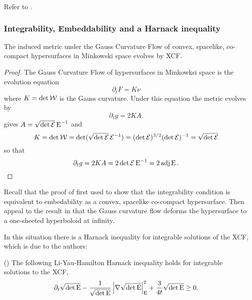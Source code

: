 \documentclass[a4paper,12pt]{amsart}
\begin{document}
{\color{red} Refer to \cite{MR2448593}.}


\subsubsection{Integrability, Embeddability and a Harnack inequality}
\label{subsec:xcf_gcf}

\begin{lemma}
\label{lem:xcf_gcf}
The induced metric under the Gauss Curvature Flow of convex, spacelike, co-compact hypersurfaces in Minkowski space evolves by XCF.
\end{lemma}

\begin{proof}
The Gauss Curvature Flow of hypersurfaces in Minkowksi space is the evolution equation
\[
\partial_t F = K\nu
\]
where \(K = \det \operatorname{\mathcal{W}}\) is the Gauss curvature. Under this equation the metric evolves by
\[
\partial_t g = 2KA.
\]
 gives \(A = \sqrt{\det \operatorname{\mathcal{E}}} \operatorname{E}^{-1}\) and
\[
K = \det \operatorname{\mathcal{W}} = \det (\sqrt{\det \operatorname{\mathcal{E}}} \operatorname{\mathcal{E}}^{-1}) = (\det \operatorname{\mathcal{E}})^{3/2} (\det \operatorname{\mathcal{E}})^{-1} = \sqrt{\det \operatorname{\mathcal{E}}}
\]
so that
\[
\partial_t g = 2KA = 2 \det \operatorname{\mathcal{E}} \operatorname{E}^{-1} = 2 \operatorname{adj} \operatorname{E}.
\]
\end{proof}

Recall that the proof of  first used  to show that the integrability condition is equivalent to embedability as a convex, spacelike co-compact hypersurface. Then appeal to the result in \cite[12. Application to the cross-curvature flow]{MR3344442} that the Gauss curvature flow deforms the hypersurface to a one-sheeted hyperboloid at infinity. 

In this situation there is a Harnack inequality for integrable solutions of the XCF, which is due to the authors:

\begin{thm}(\cite[Section 6]{BIS4})
\label{thm:harnack}
The following Li-Yau-Hamilton Harnack inequality holds for integrable solutions to the XCF,
\[
\partial_t \sqrt{\det\operatorname{E}} - \frac{1}{\sqrt{\det\operatorname{E}}} \left\lvert{\nabla \sqrt{\det\operatorname{E}}}\right\rvert_{\operatorname{E}}^2 + \frac{3}{4t}\sqrt{\det\operatorname{E}} \geq 0.
\]
\end{thm}

\end{document}
